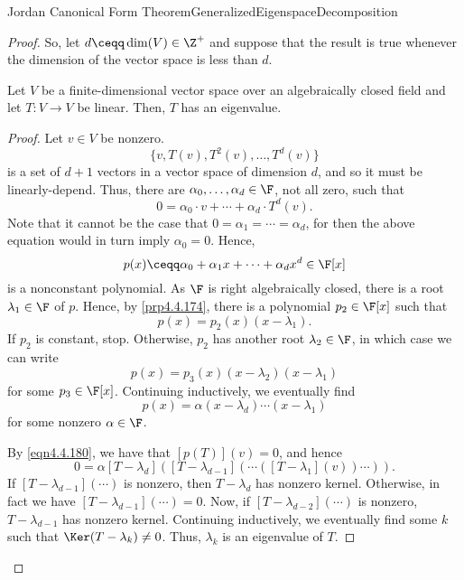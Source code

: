 \begin{thm}{Jordan Canonical Form Theorem}{GeneralizedEigenspaceDecomposition}
\begin{proof}
		So, let $d\ceqq \dim (V)\in \Z ^+$ and suppose that the result is true whenever the dimension of the vector space is less than $d$.
		\begin{lma}[break at=5in/6.8in/0pt]{}{}
			Let $V$ be a finite-dimensional vector space over an algebraically closed field and let $T\colon V\rightarrow V$ be linear.  Then, $T$ has an eigenvalue.
			\begin{proof}
				Let $v\in V$ be nonzero.
				\begin{equation}
				\{ v,T(v),T^2(v),\ldots ,T^d(v)\}
				\end{equation}
				is a set of $d+1$ vectors in a vector space of dimension $d$, and so it must be linearly-depend.  Thus, there are $\alpha _0,\ldots ,\alpha _d\in \F$, not all zero, such that
				\begin{equation}\label{eqn4.4.180}
				0=\alpha _0\cdot v+\cdots +\alpha _d\cdot T^d(v).
				\end{equation}
				Note that it cannot be the case that $0=\alpha _1=\cdots =\alpha _d$, for then the above equation would in turn imply $\alpha _0=0$.  Hence,
				\begin{equation}
					p(x)\ceqq \alpha _0+\alpha _1x+\cdots +\alpha _dx^d\in \F [x]
				\end{equation}
				is a nonconstant polynomial.  As $\F$ is right algebraically closed, there is a root $\lambda _1\in \F$ of $p$.  Hence, by \cref{prp4.4.174}, there is a polynomial $p_2\in \F [x]$ such that
				\begin{equation}
					p(x)=p_2(x)(x-\lambda _1).
				\end{equation}
				If $p_2$ is constant, stop.  Otherwise, $p_2$ has another root $\lambda _2\in \F$, in which case we can write
				\begin{equation}
					p(x)=p_3(x)(x-\lambda _2)(x-\lambda _1)
				\end{equation}
				for some $p_3\in \F [x]$.  Continuing inductively, we eventually find
				\begin{equation}
					p(x)=\alpha (x-\lambda _d)\cdots (x-\lambda _1)
				\end{equation}
				for some nonzero $\alpha \in \F$.
				
				By \eqref{eqn4.4.180}, we have that $[p(T)](v)=0$, and hence
				\begin{equation}
					0=\alpha [T-\lambda _d]\left( [T-\lambda _{d-1}]\left( \cdots ([T-\lambda _1](v))\cdots \right) \right) .
				\end{equation}
				If $[T-\lambda _{d-1}](\cdots )$ is nonzero, then $T-\lambda _d$ has nonzero kernel.  Otherwise, in fact we have $[T-\lambda _{d-1}](\cdots )=0$.  Now, if $[T-\lambda _{d-2}](\cdots )$ is nonzero, $T-\lambda _{d-1}$ has nonzero kernel.  Continuing inductively, we eventually find some $k$ such that $\Ker (T-\lambda _k)\neq 0$.  Thus, $\lambda _k$ is an eigenvalue of $T$.
			\end{proof}
		\end{lma}
	

\end{proof}
\end{thm}
